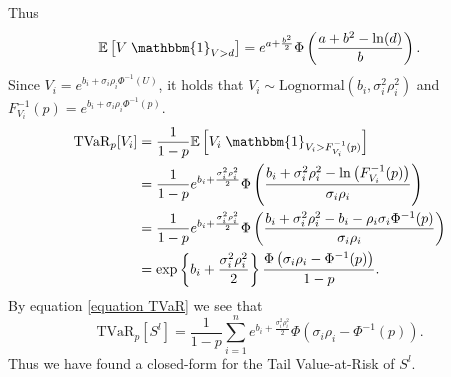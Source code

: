 \documentclass{article}
\begin{document}
Thus 
\begin{equation}\label{equation expected value for TVaR calculations}
    \mathbb{E}\left[V\;\mathbbm{1}_{V > d}\right] =  e^{a+\frac{b^2}{2}} \Phi\left(\frac{a + b^2 - \ln(d)}{b}\right).
\end{equation}
Since $V_i = e^{b_i+ \sigma_i\rho_i\Phi^{-1}(U)} $, it holds that $V_i\sim \text{Lognormal}(b_i, \sigma_i^2\rho_i^2)$ and $F_{V_i}^{-1}(p) = e^{b_i+ \sigma_i\rho_i\Phi^{-1}(p)}$.
\begin{align*}
    \text{TVaR}_p[V_i] &=  \frac{1}{1-p} \mathbb{E}\left[V_i\;\mathbbm{1}_{V_i > F_{V_i}^{-1}(p)}\right] \\
    &= \frac{1}{1-p} e^{b_i+\frac{\sigma_i^2\rho_i^2}{2}} \Phi\left(\frac{b_i + \sigma_i^2\rho_i^2 - \ln\left(F_{V_i}^{-1}(p)\right)}{\sigma_i\rho_i}\right)\\
    &= \frac{1}{1-p} e^{b_i+\frac{\sigma_i^2\rho_i^2}{2}} \Phi\left(\frac{b_i + \sigma_i^2\rho_i^2 - b_i - \rho_i\sigma_i\Phi^{-1}(p)}{\sigma_i\rho_i}\right)\\
    &= \exp\left\{{b_i+\frac{\sigma_i^2\rho_i^2}{2}}\right\}\frac{ \Phi\left(\sigma_i\rho_i- \Phi^{-1}(p)\right)}{1-p}.
\end{align*}
By equation \eqref{equation TVaR} we see that
$$\text{TVaR}_p\left[S^l\right] = \frac{1}{1-p}\sum_{i=1}^n e^{{b_i+\frac{\sigma_i^2\rho_i^2}{2}}}\Phi\left(\sigma_i\rho_i- \Phi^{-1}(p)\right).$$
Thus we have found a closed-form for the Tail Value-at-Risk of $S^l$.
\end{document}

